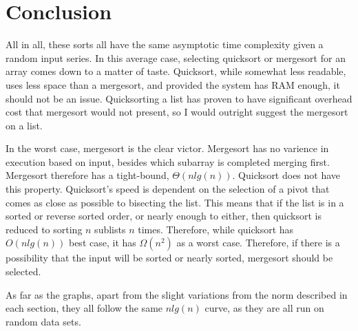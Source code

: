 \documentclass[a4paper,12pt]{article}
\begin{document}
\section{Conclusion}
All in all, these sorts all have the same asymptotic time complexity given a random input series. In this average case, selecting quicksort or mergesort for an
array comes down to a matter of taste. Quicksort, while somewhat less readable, uses less space than a mergesort, and provided the system has RAM enough, it should
not be an issue. Quicksorting a list has proven to have significant overhead cost that mergesort would not present, so I would outright suggest the mergesort on a list.

In the worst case, mergesort is the clear victor. Mergesort has no varience in execution based on input, besides which subarray is completed merging first.
Mergesort therefore has a tight-bound, $\Theta(nlg(n))$. Quicksort does not have this property. Quicksort's speed is dependent on the selection of a pivot that comes as close as possible
to bisecting the list. This means that if the list is in a sorted or reverse sorted order, or nearly enough to either, then quicksort is reduced to sorting $n$ sublists $n$ times.
Therefore, while quicksort has $O(nlg(n))$ best case, it has $\Omega(n^2)$ as a worst case. Therefore, if there is a possibility that the input will be sorted or nearly sorted,
mergesort should be selected.

As far as the graphs, apart from the slight variations from the norm described in each section, they all follow the same $nlg(n)$ curve, as they are all run on random data sets.
\end{document}
